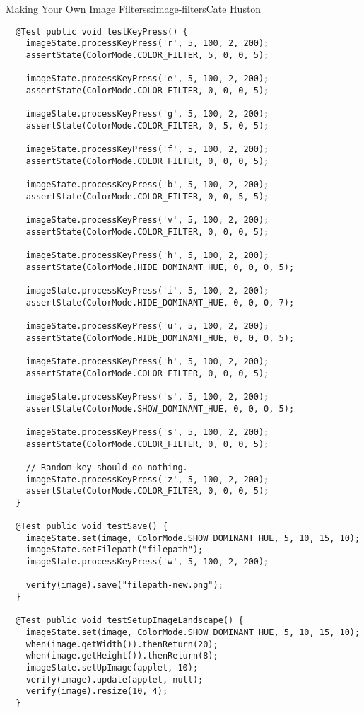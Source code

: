 \begin{aosachapter}{Making Your Own Image Filters}{s:image-filters}{Cate Huston}
\begin{verbatim}
  @Test public void testKeyPress() {
    imageState.processKeyPress('r', 5, 100, 2, 200);
    assertState(ColorMode.COLOR_FILTER, 5, 0, 0, 5);

    imageState.processKeyPress('e', 5, 100, 2, 200);
    assertState(ColorMode.COLOR_FILTER, 0, 0, 0, 5);

    imageState.processKeyPress('g', 5, 100, 2, 200);
    assertState(ColorMode.COLOR_FILTER, 0, 5, 0, 5);

    imageState.processKeyPress('f', 5, 100, 2, 200);
    assertState(ColorMode.COLOR_FILTER, 0, 0, 0, 5);

    imageState.processKeyPress('b', 5, 100, 2, 200);
    assertState(ColorMode.COLOR_FILTER, 0, 0, 5, 5);

    imageState.processKeyPress('v', 5, 100, 2, 200);
    assertState(ColorMode.COLOR_FILTER, 0, 0, 0, 5);

    imageState.processKeyPress('h', 5, 100, 2, 200);
    assertState(ColorMode.HIDE_DOMINANT_HUE, 0, 0, 0, 5);

    imageState.processKeyPress('i', 5, 100, 2, 200);
    assertState(ColorMode.HIDE_DOMINANT_HUE, 0, 0, 0, 7);

    imageState.processKeyPress('u', 5, 100, 2, 200);
    assertState(ColorMode.HIDE_DOMINANT_HUE, 0, 0, 0, 5);

    imageState.processKeyPress('h', 5, 100, 2, 200);
    assertState(ColorMode.COLOR_FILTER, 0, 0, 0, 5);

    imageState.processKeyPress('s', 5, 100, 2, 200);
    assertState(ColorMode.SHOW_DOMINANT_HUE, 0, 0, 0, 5);

    imageState.processKeyPress('s', 5, 100, 2, 200);
    assertState(ColorMode.COLOR_FILTER, 0, 0, 0, 5);

    // Random key should do nothing.
    imageState.processKeyPress('z', 5, 100, 2, 200);
    assertState(ColorMode.COLOR_FILTER, 0, 0, 0, 5);
  }

  @Test public void testSave() {
    imageState.set(image, ColorMode.SHOW_DOMINANT_HUE, 5, 10, 15, 10);
    imageState.setFilepath("filepath");
    imageState.processKeyPress('w', 5, 100, 2, 200);

    verify(image).save("filepath-new.png");
  }

  @Test public void testSetupImageLandscape() {
    imageState.set(image, ColorMode.SHOW_DOMINANT_HUE, 5, 10, 15, 10);
    when(image.getWidth()).thenReturn(20);
    when(image.getHeight()).thenReturn(8);
    imageState.setUpImage(applet, 10);
    verify(image).update(applet, null);
    verify(image).resize(10, 4);
  }


\end{verbatim}
\end{aosachapter}
